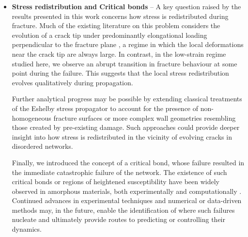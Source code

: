 \documentclass[asymmetricmargins]{library/duthesis}%
\begin{document}
\begin{itemize}
    However, in the networks considered here, the relaxation time increases as the connectivity is reduced towards the isostatic point $z_c$, diverging as a power law at $z_c$ \cite{shivers_strain-controlled_2023}. This could, in principle, provide an alternative athermal route to ultra-delayed failure if the material relaxes sufficiently slowly. However, in this regime, the sample-to-sample variance of the fracture strain also grows significantly \cite{zhang_fiber_2017}, so failure becomes strongly dependent on the specific network realisation. Moreover, it is not clear that a marginally stable network is able to store sufficient elastic energy to fail a long time after the imposed strain.  As a result, although an athermal mechanism cannot be excluded, it would require fine tuning of connectivity and imposed strain (if it is possible), and is therefore unlikely to provide a robust route to ultra-delayed failure.

    \item {\bf Stress redistribution and Critical bonds} -- A key question raised by the results presented in this work concerns how stress is redistributed during fracture. Much of the existing literature on this problem considers the evolution of a crack tip under predominantly elongational loading perpendicular to the fracture plane \cite{sanner_less_2025, bolander_fracture_1998, shekhawat_damage_2013, slepyan_models_2002, ju_role_nodate}, a regime in which the local deformations near the crack tip are always large. In contrast, in the low-strain regime studied here, we observe an abrupt transition in fracture behaviour at some point during the failure. This suggests that the local stress redistribution evolves qualitatively during propagation. 

    Further analytical progress may be possible by extending classical treatments of the Eshelby stress propagator \cite{picard_elastic_2004, eshelby_determination_1997} to account for the presence of non-homogeneous fracture surfaces or more complex wall geometries resembling those created by pre-existing damage. Such approaches could provide deeper insight into how stress is redistributed in the vicinity of evolving cracks in disordered networks.

    Finally, we introduced the concept of a critical bond, whose failure resulted in the immediate catastrophic failure of the network. The existence of such critical bonds or regions of heightened susceptibility have been widely observed in amorphous materials, both experimentally and computationally \cite{mattsson_time-dependent_2017,cipelletti_microscopic_2020,yu_shortest_2024,membrillo_solis_tracking_2022,ozawaRareEventsDisorder2022,aimeMicroscopicDynamicsFailure2018,nabizadeh_network_2024}. Continued advances in experimental techniques \cite{porr_probing_2025} and numerical or data-driven methods \cite{mangal_predicting_2024,mangal_topological_2023,cubuk_identifying_2015} may, in the future, enable the identification of where such failures nucleate and ultimately provide routes to predicting or controlling their dynamics.


\end{itemize}
\end{document}
